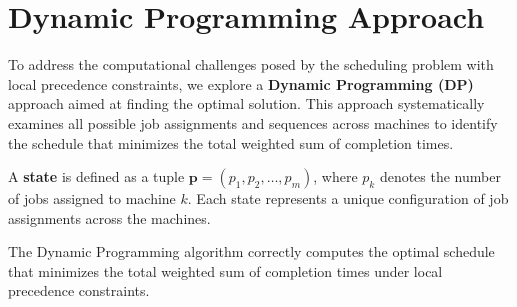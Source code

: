 \section{Dynamic Programming Approach}

To address the computational challenges posed by the scheduling problem with local precedence constraints, we explore a \textbf{Dynamic Programming (DP)} approach aimed at finding the optimal solution. This approach systematically examines all possible job assignments and sequences across machines to identify the schedule that minimizes the total weighted sum of completion times.

\begin{definition}[State] \label{def:state}
    A \textbf{state} is defined as a tuple $\boldsymbol{p} = (p_1, p_2, \dots, p_m)$, where $p_k$ denotes the number of jobs assigned to machine $k$. Each state represents a unique configuration of job assignments across the machines.
\end{definition}

\begin{theorem}
    The Dynamic Programming algorithm correctly computes the optimal schedule that minimizes the total weighted sum of completion times under local precedence constraints.
\end{theorem}

